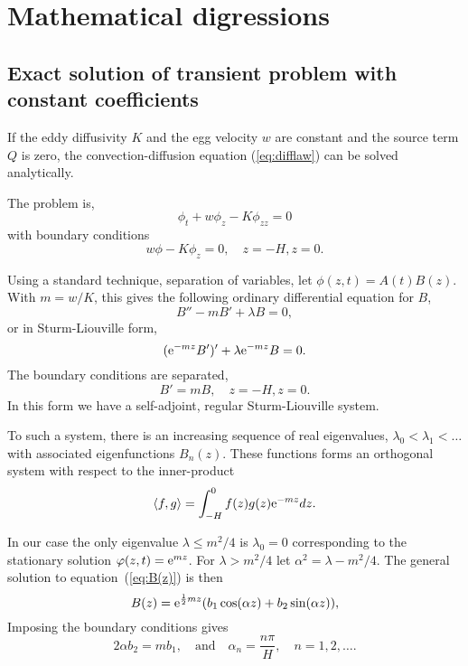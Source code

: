 \chapter{Mathematical digressions}

\section{Exact solution of transient problem with constant
  coefficients}



If the eddy diffusivity $K$ and the egg velocity $w$ are constant and
the source term $Q$ is zero, the convection-diffusion equation
(\ref{eq:difflaw}) can be solved analytically.

The problem is,
\begin{equation}\label{eq:constpde}
  \phi_t + w \phi_z - K \phi_{zz} = 0
\end{equation}
with boundary conditions
\begin{equation}
  w \phi - K \phi_z = 0, \quad z = -H, z = 0 .
\end{equation}

Using a standard technique, separation of variables, let
$ \phi(z,t) = A(t) B(z) $. 
With $m = w/K$, this gives the following ordinary differential 
equation for $B$,
\begin{equation}\label{eq:B(z)}
  B'' - m B' + \lambda B = 0 ,
\end{equation}
or in Sturm-Liouville form, 
\begin{equation}
  (\mathrm{e}^{-mz} B')' + \lambda \mathrm{e}^{-mz} B = 0 .
\end{equation}
The boundary conditions are separated,
\begin{equation}
 B' = m B, \quad z = -H, z = 0.
\end{equation}
In this form we have a self-adjoint, regular Sturm-Liouville system.

To such a system, there is an increasing sequence of real eigenvalues,
$\lambda_0 < \lambda_1 < \dots$ with associated eigenfunctions
$B_n(z)$. These functions forms an orthogonal system with respect
to the inner-product 
\begin{equation}
  \langle f,g \rangle = \int_{-H}^0 f(z) g(z) \mathrm{e}^{-mz} dz .
\end{equation}



In our case the only eigenvalue $\lambda \le m^2/4$ is
$\lambda_0 = 0$ corresponding to the stationary
solution $\varphi(z,t) = \mathrm{e}^{mz}$. For $\lambda > m^2/4$ 
let $\alpha^2 = \lambda - m^2/4$. 
The general solution to equation~(\ref{eq:B(z)}) is then
\begin{equation}
  B(z) = \mathrm{e}^{\frac{1}{2} m z} (b_1 \cos(\alpha z) + b_2 \sin(\alpha z)),
\end{equation}
Imposing the boundary conditions gives
\begin{equation}
  2 \alpha b_2 = m b_1, \quad \mbox{and} \quad
   \alpha_n = \frac{n \pi}{H}, \quad n = 1, 2, \dots .
\end{equation}

